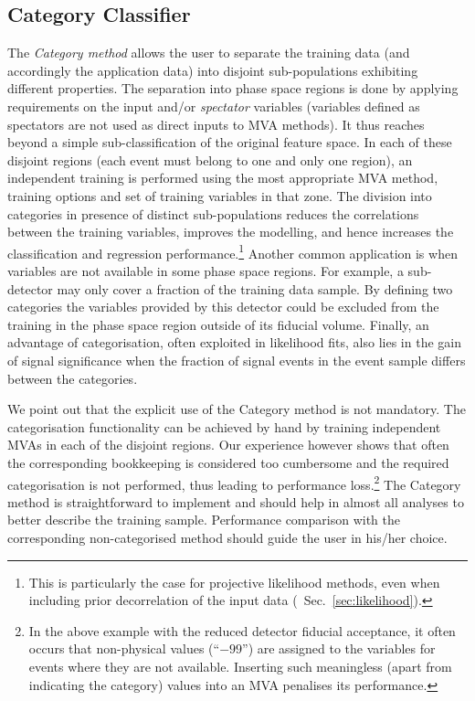 \subsection{Category Classifier}
\label{sec:category}

The {\em Category method} allows the user to separate the training data (and accordingly the 
application data) into disjoint sub-populations exhibiting  different
properties. The separation into phase space regions is done by applying requirements
on the input and/or {\em spectator} variables (variables defined as spectators are 
not used as direct inputs to MVA methods). 
It thus reaches beyond a simple sub-classification of the original feature space.
In each of these disjoint regions (each event must belong to one and only one region), 
an independent training is performed using the most appropriate MVA method, training 
options and set of training variables in that zone. The division into categories in 
presence of distinct sub-populations reduces the correlations between the training 
variables, improves the modelling, and hence increases the classification and 
regression performance.\footnote
{
   This is particularly the case for projective likelihood methods, even when 
   including prior decorrelation of the input data (\cf\  Sec.~\ref{sec:likelihood}). 
}
Another common application is when variables are not available 
in some phase space regions. For example, a sub-detector may only cover a fraction of
the training data sample. By defining two categories the variables provided by this 
detector could be excluded from the training in the phase space region outside 
of its fiducial volume. Finally, an advantage of categorisation, often exploited 
in likelihood fits, also lies in the gain of signal significance when the fraction of 
signal events in the event sample differs between the categories. 

We point out that the explicit use of the Category method is not mandatory. The categorisation
functionality can be achieved by hand by training independent MVAs in each of the 
disjoint regions. Our experience however shows that often the corresponding bookkeeping
is considered too cumbersome and the required categorisation is not performed, 
thus leading to performance loss.\footnote
{
   In the above example with the reduced detector fiducial acceptance, it often occurs that 
   non-physical values (``$-99$'') are assigned to the variables for events where they are 
   not available. Inserting such meaningless (apart from indicating the category) 
   values into an MVA penalises its performance. 
}
The Category method is straightforward to implement and should help in almost all analyses
to better describe the training sample. Performance comparison with the corresponding
non-categorised method should guide the user in his/her choice. 

